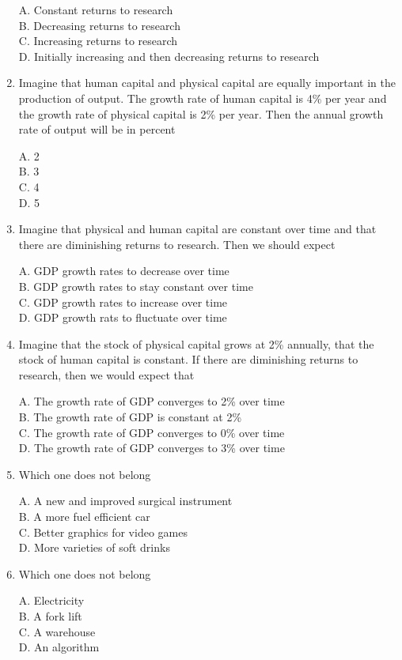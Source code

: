 \documentclass[
]{book}
\begin{document}
\begin{enumerate}
  A. Constant returns to research\\
  B. Decreasing returns to research\\
  C. Increasing returns to research\\
  D. Initially increasing and then decreasing returns to research
\item
  Imagine that human capital and physical capital are equally important in the production of output. The growth rate of human capital is 4\% per year and the growth rate of physical capital is 2\% per year. Then the annual growth rate of output will be in percent

  A. 2\\
  B. 3\\
  C. 4\\
  D. 5
\item
  Imagine that physical and human capital are constant over time and that there are diminishing returns to research. Then we should expect

  A. GDP growth rates to decrease over time\\
  B. GDP growth rates to stay constant over time\\
  C. GDP growth rates to increase over time\\
  D. GDP growth rats to fluctuate over time
\item
  Imagine that the stock of physical capital grows at 2\% annually, that the stock of human capital is constant. If there are diminishing returns to research, then we would expect that

  A. The growth rate of GDP converges to 2\% over time\\
  B. The growth rate of GDP is constant at 2\%\\
  C. The growth rate of GDP converges to 0\% over time\\
  D. The growth rate of GDP converges to 3\% over time
\item
  Which one does not belong

  A. A new and improved surgical instrument\\
  B. A more fuel efficient car\\
  C. Better graphics for video games\\
  D. More varieties of soft drinks
\item
  Which one does not belong

  A. Electricity\\
  B. A fork lift\\
  C. A warehouse\\
  D. An algorithm
\end{enumerate}
\end{document}
